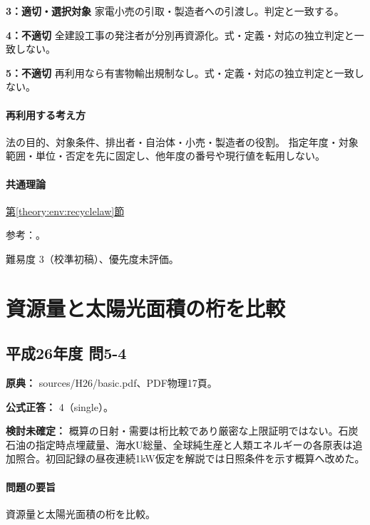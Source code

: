 \noindent\textbf{3：適切・選択対象} 家電小売の引取・製造者への引渡し。判定と一致する。\par

\noindent\textbf{4：不適切} 全建設工事の発注者が分別再資源化。式・定義・対応の独立判定と一致しない。\par

\noindent\textbf{5：不適切} 再利用なら有害物輸出規制なし。式・定義・対応の独立判定と一致しない。\par

\paragraph{再利用する考え方} 法の目的、対象条件、排出者・自治体・小売・製造者の役割。 指定年度・対象範囲・単位・否定を先に固定し、他年度の番号や現行値を転用しない。

\paragraph{共通理論} \hyperref[theory:env:recyclelaw]{第\ref*{theory:env:recyclelaw}節}

\par 参考：\cite{env_circular_law,env_appliance}。

\par 難易度 3（校準初稿）、優先度未評価。

\section{資源量と太陽光面積の桁を比較}

\subsection{平成26年度 問5-4}
\label{q:h26-reg-basic-5-4}

\noindent\textbf{原典：} sources/H26/basic.pdf、PDF物理17頁。

\textbf{公式正答：} 4（single）。

\par\textbf{検討未確定：} 概算の日射・需要は桁比較であり厳密な上限証明ではない。石炭石油の指定時点埋蔵量、海水U総量、全球純生産と人類エネルギーの各原表は追加照合。初回記録の昼夜連続1kW仮定を解説では日照条件を示す概算へ改めた。

\paragraph{問題の要旨} 資源量と太陽光面積の桁を比較。

